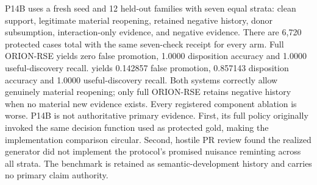 \markdownRendererDocumentBegin
\markdownRendererSectionBegin
{}\markdownRendererInterblockSeparator
{}P14B uses a fresh seed and 12 held-out families with seven equal strata: clean support, legitimate material reopening, retained negative history, donor subsumption, interaction-only evidence,  and negative evidence. There are 6,720 protected cases total with the same seven-check receipt for every arm.\markdownRendererInterblockSeparator
{}Full ORION-RSE yields zero false promotion, 1.0000 disposition accuracy and 1.0000 useful-discovery recall.  yields 0.142857 false promotion, 0.857143 disposition accuracy and 1.0000 useful-discovery recall. Both systems correctly allow genuinely material reopening; only full ORION-RSE retains negative history when no material new evidence exists. Every registered component ablation is worse.\markdownRendererInterblockSeparator
{}P14B is not authoritative primary evidence. First, its full policy originally invoked the same decision function used as protected gold, making the implementation comparison circular. Second, hostile PR review found the realized generator did not implement the protocol's promised nuisance reminting across all strata. The benchmark is retained as semantic-development history and carries no primary claim authority.
\markdownRendererSectionEnd \markdownRendererDocumentEnd